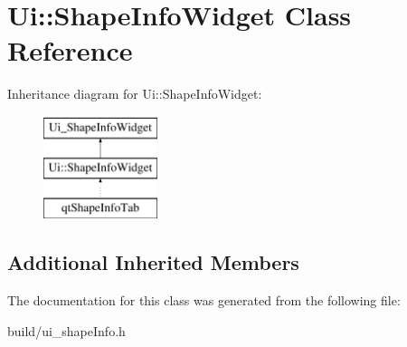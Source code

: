 \hypertarget{class_ui_1_1_shape_info_widget}{}\section{Ui\+:\+:Shape\+Info\+Widget Class Reference}
\label{class_ui_1_1_shape_info_widget}
Inheritance diagram for Ui\+:\+:Shape\+Info\+Widget\+:\begin{figure}[H]
\begin{center}
\leavevmode
\includegraphics[height=3.000000cm]{class_ui_1_1_shape_info_widget}
\end{center}
\end{figure}
\subsection*{Additional Inherited Members}


The documentation for this class was generated from the following file\+:\begin{DoxyCompactItemize}
\item 
build/ui\+\_\+shape\+Info.\+h\end{DoxyCompactItemize}
